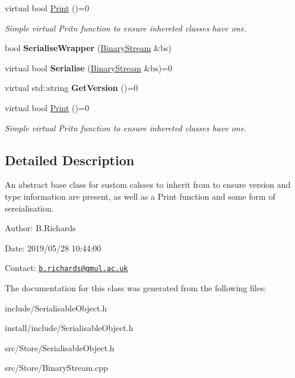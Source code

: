 \begin{DoxyCompactItemize}
\item 
\hypertarget{classSerialisableObject_a9055c98969917d4c652eefdc924b6b75}{virtual bool \hyperlink{classSerialisableObject_a9055c98969917d4c652eefdc924b6b75}{Print} ()=0}\label{classSerialisableObject_a9055c98969917d4c652eefdc924b6b75}

\begin{DoxyCompactList}\small\item\em Simple virtual Pritn function to ensure inhereted classes have one. \end{DoxyCompactList}\item 
\hypertarget{classSerialisableObject_a3783b1798068a4bdc58fe6cdf7f7929b}{bool {\bfseries Serialise\-Wrapper} (\hyperlink{classBinaryStream}{Binary\-Stream} \&bs)}\label{classSerialisableObject_a3783b1798068a4bdc58fe6cdf7f7929b}

\item 
\hypertarget{classSerialisableObject_ab8916a102bc94764f023b1713fb040db}{virtual bool {\bfseries Serialise} (\hyperlink{classBinaryStream}{Binary\-Stream} \&bs)=0}\label{classSerialisableObject_ab8916a102bc94764f023b1713fb040db}

\item 
\hypertarget{classSerialisableObject_a345b21d2a7c869dedd96ad691fc602bd}{virtual std\-::string {\bfseries Get\-Version} ()=0}\label{classSerialisableObject_a345b21d2a7c869dedd96ad691fc602bd}

\item 
\hypertarget{classSerialisableObject_a9055c98969917d4c652eefdc924b6b75}{virtual bool \hyperlink{classSerialisableObject_a9055c98969917d4c652eefdc924b6b75}{Print} ()=0}\label{classSerialisableObject_a9055c98969917d4c652eefdc924b6b75}

\begin{DoxyCompactList}\small\item\em Simple virtual Pritn function to ensure inhereted classes have one. \end{DoxyCompactList}\end{DoxyCompactItemize}


\subsection{Detailed Description}
An abstract base class for sustom calsses to inherit from to ensure version and type information are present, as well as a Print function and some form of sereialisation.

\begin{DoxyParagraph}{Author\-:}
B.\-Richards 
\end{DoxyParagraph}
\begin{DoxyParagraph}{Date\-:}
2019/05/28 10\-:44\-:00 
\end{DoxyParagraph}
Contact\-: \href{mailto:b.richards@qmul.ac.uk}{\tt b.\-richards@qmul.\-ac.\-uk} 

The documentation for this class was generated from the following files\-:\begin{DoxyCompactItemize}
\item 
include/Serialisable\-Object.\-h\item 
install/include/Serialisable\-Object.\-h\item 
src/\-Store/Serialisable\-Object.\-h\item 
src/\-Store/Binary\-Stream.\-cpp\end{DoxyCompactItemize}
